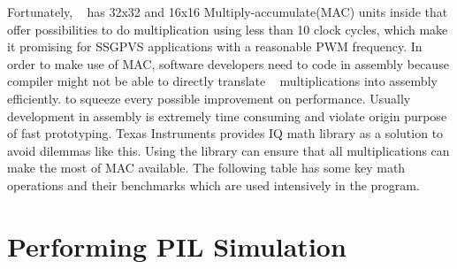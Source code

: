 Fortunately, \tms~ has 32x32 and 16x16 Multiply-accumulate(MAC) units inside that offer possibilities to do multiplication using less than 10 clock cycles, which make it promising for \gls{SSGPVS} applications with a reasonable \gls{PWM} frequency. In order to make use of MAC, software developers need to code in assembly because compiler might not be able to directly translate \fp~ multiplications into assembly efficiently. to squeeze every possible improvement on performance. Usually development in assembly is extremely time consuming and violate origin purpose of fast prototyping. Texas Instruments provides IQ math library as a solution to avoid dilemmas like this. Using the library can ensure that all multiplications can make the most of MAC available. The following table has some key math operations and their benchmarks\cite{iqmath_lib} which are used intensively in the program.
\section{Performing \gls{PIL} Simulation}\label{sec:perform_pil}